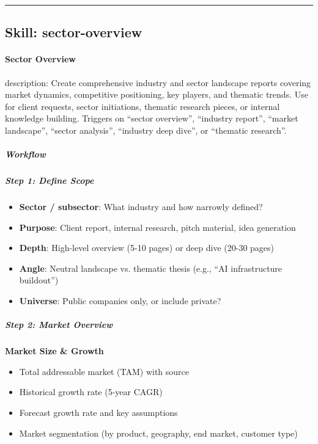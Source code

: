 \documentclass[11pt]{article}
\begin{document}
\vspace{0.8em}\hrule\vspace{0.8em}

\subsection{Skill: sector-overview}\label{file:market-researcher-skills-sector-overview-SKILL-md}

\paragraph{Sector Overview}\mbox{}\par

description: Create comprehensive industry and sector landscape reports covering market dynamics, competitive positioning, key players, and thematic trends. Use for client requests, sector initiations, thematic research pieces, or internal knowledge building. Triggers on ``sector overview'', ``industry report'', ``market landscape'', ``sector analysis'', ``industry deep dive'', or ``thematic research''.


\subparagraph{Workflow}\mbox{}\par

\subparagraph{Step 1: Define Scope}\mbox{}\par

\begin{itemize}[leftmargin=*,itemsep=2pt,topsep=2pt]
\item {} \textbf{Sector / subsector}: What industry and how narrowly defined?
\item {} \textbf{Purpose}: Client report, internal research, pitch material, idea generation
\item {} \textbf{Depth}: High-level overview (5-10 pages) or deep dive (20-30 pages)
\item {} \textbf{Angle}: Neutral landscape vs. thematic thesis (e.g., ``AI infrastructure buildout'')
\item {} \textbf{Universe}: Public companies only, or include private?
\end{itemize}

\subparagraph{Step 2: Market Overview}\mbox{}\par

\textbf{Market Size \& Growth}

\begin{itemize}[leftmargin=*,itemsep=2pt,topsep=2pt]
\item {} Total addressable market (TAM) with source
\item {} Historical growth rate (5-year CAGR)
\item {} Forecast growth rate and key assumptions
\item {} Market segmentation (by product, geography, end market, customer type)
\end{itemize}
\end{document}
